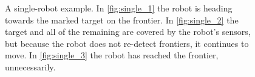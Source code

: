 \begin{figure}
 \centering
 \caption{A single-robot example. In 
 \ref{fig:single_1} the robot is heading towards the marked target on the frontier.  In 
 \ref{fig:single_2} the target and all of the remaining are covered by the robot's sensors, but because the robot does
  not re-detect frontiers, it continues to move.  In  \ref{fig:single_3} the robot has reached the frontier, unnecessarily.
 }
 \label{fig:single_example}
 
\end{figure}


